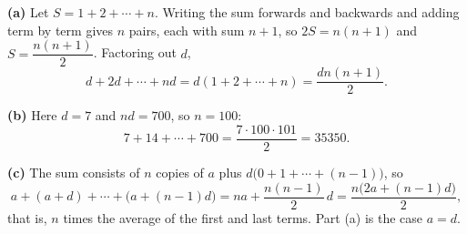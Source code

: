 \textbf{(a)} Let $S=1+2+\cdots+n$. Writing the sum forwards and backwards and adding term by term gives $n$ pairs, each with sum $n+1$, so $2S=n(n+1)$ and $S=\dfrac{n(n+1)}{2}$. Factoring out $d$,
\[d+2d+\cdots+nd=d(1+2+\cdots+n)=\dfrac{dn(n+1)}{2}.\]

\textbf{(b)} Here $d=7$ and $nd=700$, so $n=100$:
\[7+14+\cdots+700=\dfrac{7\cdot100\cdot101}{2}=\boxed{35350}.\]

\textbf{(c)} The sum consists of $n$ copies of $a$ plus $d\bigl(0+1+\cdots+(n-1)\bigr)$, so
\[a+(a+d)+\cdots+\bigl(a+(n-1)d\bigr)=na+\dfrac{n(n-1)}{2}\,d=\boxed{\dfrac{n\bigl(2a+(n-1)d\bigr)}{2}},\]
that is, $n$ times the average of the first and last terms. Part (a) is the case $a=d$.
